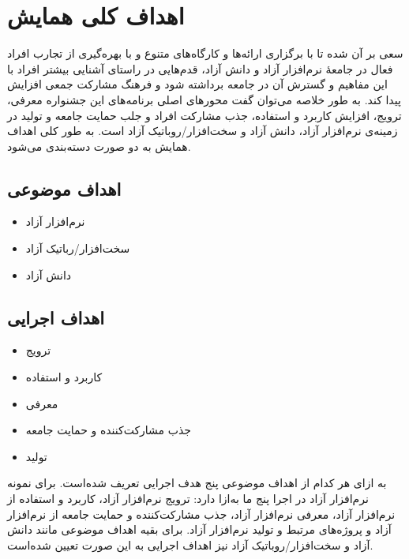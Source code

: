 \documentclass{article}
\begin{document}
\section{اهداف کلی همایش}
سعی بر آن شده تا با برگزاری ارائه‌ها و کارگاه‌های متنوع و با بهره‌گیری از تجارب افراد فعال در جامعهٔ نرم‌افزار آزاد و دانش آزاد، قدم‌هایی در راستای آشنایی بیشتر افراد با این مفاهیم و گسترش آن در جامعه برداشته شود و فرهنگ مشارکت جمعی افزایش پیدا کند. به طور خلاصه می‌توان گفت محورهای اصلی برنامه‌های این جشنواره معرفی، ترویج، افزایش کاربرد و استفاده، جذب مشارکت افراد و جلب حمایت جامعه و تولید در زمینه‌ی نرم‌افزار آزاد، دانش آزاد و سخت‌افزار/روباتیک آزاد است. به طور کلی اهداف همایش به دو صورت دسته‌بندی می‌شود.

\subsection{اهداف موضوعی}
\begin{flushright}

\begin{itemize}
\item نرم‌افزار آزاد
\item سخت‌افزار/رباتیک آزاد
\item دانش آزاد
\end{itemize}
\end{flushright}

\subsection{اهداف اجرایی}

\begin{flushright}
\begin{itemize}
\item ترویج
\item کاربرد و استفاده
\item معرفی
\item جذب مشارکت‌کننده و حمایت جامعه
\item تولید
\end{itemize}
\end{flushright}

به ازای هر کدام از اهداف موضوعی پنج هدف اجرایی تعریف شده‌است. برای نمونه نرم‌افزار آزاد در اجرا پنج ما به‌ازا دارد: ترویج نرم‌افزار آزاد، کاربرد و استفاده از نرم‌افزار آزاد، معرفی نرم‌افزار آزاد، جذب مشارکت‌کننده و حمایت جامعه از نرم‌افزار آزاد و پروژه‌های مرتبط و تولید نرم‌افزار آزاد. برای بقیه اهداف موضوعی مانند دانش آزاد و سخت‌افزار/روباتیک آزاد نیز اهداف اجرایی به این صورت تعیین شده‌است.
\end{document}
